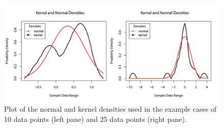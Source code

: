 \documentclass{article}
\begin{document}
\begin{figure}[h]
\includegraphics[width=\textwidth]{density_plots.jpg}
\caption{Plot of the normal and kernel densities used in the example cases of 10 data points (left pane) and 25 data points (right pane).}
\label{fig:mhde.plot}
\end{figure}
\end{document}
